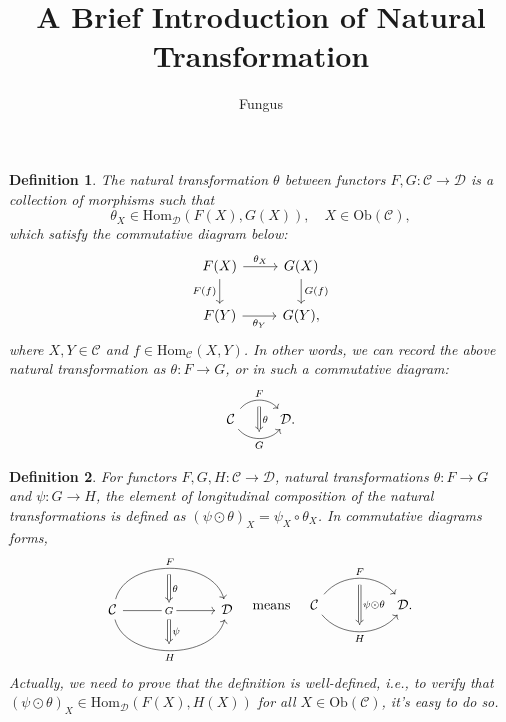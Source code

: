 \documentclass{article}
\title{A Brief Introduction of Natural Transformation}
\author{Fungus}
\begin{document}
\maketitle
\newtheorem{defi}{Definition}	\newtheorem{thm}{Theorem}

\begin{defi}\label{natural transformation}
	The {\rm natural transformation} $\theta$ between functors $F,G:\mathcal{C}\to\mathcal{D}$ is a collection of morphisms such that
	\[\theta_X\in\mathrm{Hom}_\mathcal{D}(F(X),G(X)),\quad X\in\mathrm{Ob}(\mathcal{C}),\]
	which satisfy the commutative diagram below:
	\begin{equation}\begin{tikzcd}
		F(X) \arrow[r,"\theta_X"] \arrow[d,"F(f)"'] & G(X) \arrow[d,"G(f)"] \\
		F(Y) \arrow[r,"\theta_Y"'] & G(Y),
	\end{tikzcd}\end{equation}
	where $X,Y\in\mathcal{C}$ and $f\in\mathrm{Hom}_\mathcal{C}(X,Y)$. In other words, we can record the above natural transformation as $\theta:F\to G$, or in such a commutative diagram:
	\[\begin{tikzcd}
		\mathcal{C} \arrow[r, "F", bend left=50, ""' name=F] \arrow[r, "G"', bend right=50, "" name=G] & \arrow[Rightarrow, to path=(F)--(G)\tikztonodes, "\theta"] \mathcal{D}.
	\end{tikzcd}\]
\end{defi}


\begin{defi}\label{longitudinal composition}
	For functors $F,G,H:\mathcal{C}\to\mathcal{D}$, natural transformations $\theta:F\to G$ and $\psi:G\to H$, the element of {\rm longitudinal composition} of the natural transformations is defined as $(\psi\odot\theta)_X=\psi_X\circ\theta_X$. In commutative diagrams forms,
	\[\begin{tikzcd}
		& \arrow[d,Rightarrow,"\theta"]& \\
		\mathcal{C} \arrow[rr, "F", bend left=75] \arrow[rr, "H"', bend right=75] \arrow[rr, "G" description]
		& \textcolor{white}{s} \arrow[d,Rightarrow,"\psi"]
		& \mathcal{D}\\ & \quad &
	\end{tikzcd}\quad\text{means}\quad\begin{tikzcd}
		\mathcal{C}
		\arrow[bend left=50, rr, "F", ""' name=F]
		\arrow[bend right=50, rr, "H"', "" name=H] & & 
		\arrow[Rightarrow, from=F, to=H, "\psi\odot\theta"] \mathcal{D}.
	\end{tikzcd}\]
	Actually, we need to prove that the definition is well-defined, i.e., to verify that $(\psi\odot\theta)_X\in\mathrm{Hom}_\mathcal{D}(F(X),H(X))$ for all $X\in\mathrm{Ob}(\mathcal{C})$, it's easy to do so.
\end{defi}
\end{document}
